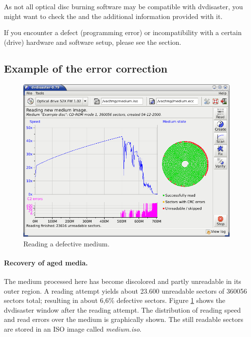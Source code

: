 \smallskip

As not all optical disc burning software may be compatible with dvdisaster,
you might want to check
the  and the additional
information provided with it.

\smallskip

If you encounter a defect (programming error) or
incompatibility with a certain (drive) hardware and software setup,
please see the  section.


\subsection{Example of the error correction}

\begin{figure}[h]
\centerline{\includegraphics[width=\textwidth]{screenshots/recover-linear.png}}
\caption{Reading a defective medium.}  
\label{recover-linear}
\end{figure}

\paragraph{Recovery of aged media.} 
The medium processed here has become discolored and partly unreadable in its outer region.
A reading attempt yields about 23.600 unreadable sectors of 360056 sectors total;
resulting in about 6,6\% defective sectors. Figure \ref{recover-linear} shows the
dvdisaster window after the reading attempt. The distribution of reading speed and
read errors over the medium is graphically shown.
The still readable sectors are stored in an ISO image called {\em medium.iso}.

